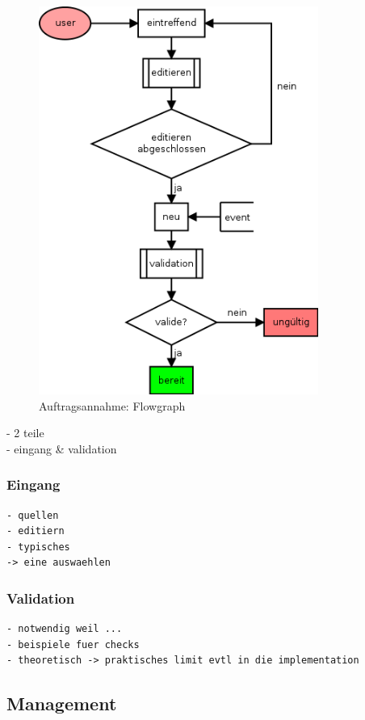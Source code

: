 \begin{figure}[ht]
  \centering
  \label{fig:lebenszyklus-auftrag-eingang}
  \includegraphics[height=5in]{imageinput/lebenszyklus-auftrag-eingang.png}
  \caption{Auftragsannahme: Flowgraph}
\end{figure}

- 2 teile \\
- eingang \& validation


\subsubsection{Eingang}

\begin{verbatim}
- quellen
- editiern
- typisches
-> eine auswaehlen
\end{verbatim}

\subsubsection{Validation}
\begin{verbatim}
- notwendig weil ...
- beispiele fuer checks
- theoretisch -> praktisches limit evtl in die implementation
\end{verbatim}


\subsection{Management}

